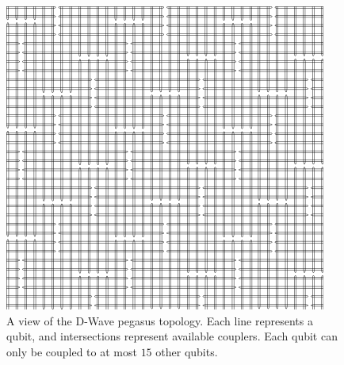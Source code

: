 \begin{figure}[!htb]
    \centering
    \includegraphics[width=0.4\linewidth]{images/pegasus_topology.png}
    \caption[A view of the D-Wave pegasus topology. Each line represents a qubit, and intersections represent available couplers. Each qubit can only be coupled to at most $15$ other qubits.]{A view of the D-Wave pegasus topology. Each line represents a qubit, and intersections represent available couplers. Each qubit can only be coupled to at most $15$ other qubits. ~\protect\cite{dwaveadvantage}}
    \label{pegasustopology}
\end{figure}

